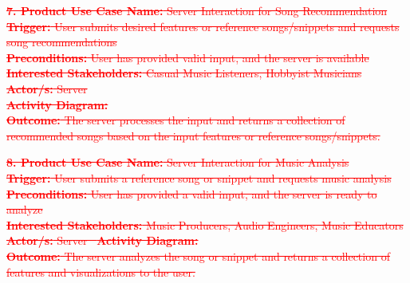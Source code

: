 \documentclass[12pt]{article}
\begin{document}
\textcolor{red}{\sout{\textbf{7. Product Use Case Name:} Server Interaction for Song Recommendation}} \\
\textcolor{red}{\sout{\textbf{Trigger:} User submits desired features or reference songs/snippets and requests song recommendations}} \\
\textcolor{red}{\sout{\textbf{Preconditions:} User has provided valid input, and the server is available}} \\
\textcolor{red}{\sout{\textbf{Interested Stakeholders:} Casual Music Listeners, Hobbyist Musicians}} \\
\textcolor{red}{\sout{\textbf{Actor/s:} Server}} \\
\textcolor{red}{\sout{\textbf{Activity Diagram:}}} \\
\textcolor{red}{\sout{\textbf{Outcome:} The server processes the input and returns a collection of recommended songs based on the input features or reference songs/snippets.}}

\vspace{1cm}

\textcolor{red}{\sout{\textbf{8. Product Use Case Name:} Server Interaction for Music Analysis}} \\
\textcolor{red}{\sout{\textbf{Trigger:} User submits a reference song or snippet and requests music analysis}} \\
\textcolor{red}{\sout{\textbf{Preconditions:} User has provided a valid input, and the server is ready to analyze}} \\
\textcolor{red}{\sout{\textbf{Interested Stakeholders:} Music Producers, Audio Engineers, Music Educators}}\\
\textcolor{red}{\sout{\textbf{Actor/s:} Server \ \textbf{Activity Diagram:}}} \\
\textcolor{red}{\sout{\textbf{Outcome:} The server analyzes the song or snippet and returns a collection of features and visualizations to the user.}}

\vspace{2cm}
\end{document}
